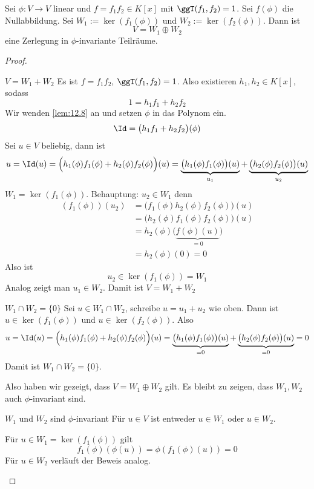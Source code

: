\documentclass[a4paper, 10pt]{scrbook}
\begin{document}
\begin{lem}
\label{lem:12.9}
Sei $\phi: V\to V$ linear und $f=f_1f_2\in K[x]$ mit $\ggT(f_1,f_2)=1$.
Sei $f(\phi)$ die Nullabbildung.
Sei $W_1:=\ker(f_1(\phi))$ und $W_2:=\ker(f_2(\phi))$.
Dann ist
\[
V=W_1\oplus W_2
\]
eine Zerlegung in $\phi$-invariante Teilräume.

\begin{proof}
	\begin{seg}{$V=W_1+W_2$}
Es ist $f=f_1f_2$, $\ggT(f_1,f_2)= 1$.
Also existieren $h_1,h_2\in K[x]$, sodass
\[
1=h_1f_1+h_2f_2
\]
Wir wenden \ref{lem:12.8} an und setzen $\phi$ in das Polynom ein.
\[
	\Id=\big(h_1f_1+h_2f_2\big)(\phi)
\]
Sei $u\in V$ beliebig, dann ist
\[
	u= \Id(u) = \Big(h_1(\phi)f_1(\phi) + h_2(\phi)f_2(\phi)\Big)(u) = \underbrace{\big(h_1(\phi)f_1(\phi)\big)(u)}_{u_1} + \underbrace{\big(h_2(\phi)f_2(\phi)\big)(u)}_{u_2} 
\]
$W_1=\ker(f_1(\phi))$. Behauptung: $u_2\in W_1$ denn
\begin{align*}
(f_1(\phi))(u_2) &= \big(f_1(\phi)h_2(\phi)f_2(\phi)\big)(u) \\
&= \big(h_2(\phi)f_1(\phi)f_2(\phi)\big)(u)\\
&= h_2(\phi)\big(\underbrace{f(\phi)(u)}_{=0}\big)\\
&= h_2(\phi)(0) = 0
\end{align*}
Also ist
\[
u_2\in \ker(f_1(\phi)) = W_1
\]
Analog zeigt man $u_1\in W_2$.
Damit ist $V=W_1+W_2$
\end{seg}
\begin{seg}{$W_1\cap W_2 =\{0\}$}
Sei $u\in W_1\cap W_2$, schreibe $u=u_1+u_2$ wie oben.
Dann ist $u\in \ker(f_1(\phi))$ und $u\in \ker(f_2(\phi))$.
Also
\[
	u= \Id(u) = \Big(h_1(\phi)f_1(\phi) + h_2(\phi)f_2(\phi)\Big)(u) = \underbrace{\big(h_1(\phi)f_1(\phi)\big)(u)}_{=0} + \underbrace{\big(h_2(\phi)f_2(\phi)\big)(u)}_{=0}  =0
\]
Damit ist $W_1\cap W_2 = \{0\}$.
\end{seg}
Also haben wir gezeigt, dass $V=W_1\oplus W_2$ gilt.
Es bleibt zu zeigen, dass $W_1,W_2$ auch $\phi$-invariant sind.

\begin{seg}{$W_1$ und $W_2$ sind $\phi$-invariant}
	Für $u\in V$ ist entweder $u\in W_1$ oder $u\in W_2$.

Für $u\in W_1=\ker(f_1(\phi))$ gilt
\[
f_1(\phi)(\phi(u)) = \phi(f_1(\phi)(u)) = 0
\]
Für $u\in W_2$ verläuft der Beweis analog.
\end{seg}
\end{proof}

\end{lem}
\end{document}
